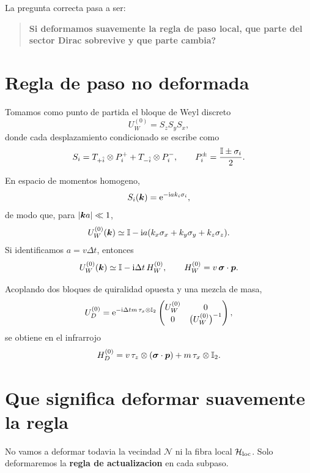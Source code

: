 La pregunta correcta pasa a ser:
\begin{quote}
\textbf{Si deformamos suavemente la regla de paso local, que parte del sector Dirac sobrevive y que parte cambia?}
\end{quote}

\section{Regla de paso no deformada}
Tomamos como punto de partida el bloque de Weyl discreto
\begin{equation}
U_W^{(0)} = S_z S_y S_x,
\end{equation}
donde cada desplazamiento condicionado se escribe como
\begin{equation}
S_i = T_{+\hat{i}}\otimes P_i^+ + T_{-\hat{i}}\otimes P_i^-,
\qquad
P_i^\pm = \frac{\mathbb{I} \pm \sigma_i}{2}.
\end{equation}

En espacio de momentos homogeno,
\begin{equation}
S_i(\bm{k})=\mathrm{e}^{-\mathrm{i} a k_i \sigma_i},
\end{equation}
de modo que, para \(\abs{\bm{k} a}\ll 1\),
\begin{equation}
U_W^{(0)}(\bm{k})
\simeq
\mathbb{I}
-\mathrm{i} a(k_x\sigma_x+k_y\sigma_y+k_z\sigma_z).
\end{equation}
Si identificamos \(a=v\Delta t\), entonces
\begin{equation}
U_W^{(0)}(\bm{k})\simeq \mathbb{I}-\mathrm{i}\Delta t\, H_W^{(0)},
\qquad
H_W^{(0)}=v\,\bm{\sigma}\cdot\bm{p}.
\end{equation}

Acoplando dos bloques de quiralidad opuesta y una mezcla de masa,
\begin{equation}
U_D^{(0)} = \mathrm{e}^{-\mathrm{i} \Delta t m\,\tau_x\otimes \mathbb{I}_2}
\begin{pmatrix}
U_W^{(0)} & 0\\
0 & \bigl(U_W^{(0)}\bigr)^{-1}
\end{pmatrix},
\end{equation}
se obtiene en el infrarrojo
\begin{equation}
H_D^{(0)}
=
v\,\tau_z\otimes(\bm{\sigma}\cdot\bm{p})
+ m\,\tau_x\otimes \mathbb{I}_2.
\label{c24:eq:Dirac0}
\end{equation}

\section{Que significa deformar suavemente la regla}
No vamos a deformar todavia la vecindad \(\mathcal N\) ni la fibra local \(\mathcal{H}_{\mathrm{loc}}\). Solo deformaremos la \textbf{regla de actualizacion} en cada subpaso.

